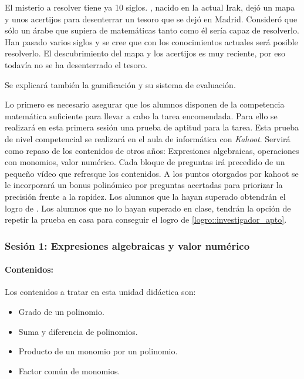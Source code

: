 El misterio a resolver tiene ya 10 siglos.
%
\Arab, nacido en la actual Irak, dejó un mapa y unos acertijos para desenterrar un tesoro que se dejó en Madrid.
%
Consideró que sólo un árabe que supiera de matemáticas tanto como él sería capaz de resolverlo.
%
Han pasado varios siglos y se cree que con los conocimientos actuales será posible resolverlo.
%
El descubrimiento del mapa y los acertijos es muy reciente, por eso todavía no se ha desenterrado el tesoro.

Se explicará también la gamificación y su sistema de evaluación.
%


Lo primero es necesario asegurar que los alumnos disponen de la competencia matemática suficiente para llevar a cabo la tarea encomendada.
%
Para ello se realizará en esta primera sesión una prueba de aptitud para la tarea.
%
Esta prueba de nivel competencial se realizará en el aula de informática con \textit{Kahoot}.
%
Servirá como repaso de los contenidos de otros años: Expresiones algebraicas, operaciones con monomios, valor numérico.
%
Cada bloque de preguntas irá precedido de un pequeño vídeo que refresque los contenidos.
%
A los puntos otorgados por kahoot se le incorporará un bonus polinómico por preguntas acertadas para priorizar la precisión frente a la rapidez.
%
Los alumnos que la hayan superado obtendrán el logro de .
%
Los alumnos que no lo hayan superado en clase, tendrán la opción de repetir la prueba en casa para conseguir el logro de \ref{logro::investigador_apto}.



\subsubsection{Sesión 1: Expresiones algebraicas y valor numérico}

\paragraph{Contenidos:}
Los contenidos a tratar en esta unidad didáctica son:
\begin{itemize}
\item Grado de un polinomio.
\item Suma y diferencia de polinomios.
\item Producto de un monomio por un polinomio.
\item Factor común de monomios.
\end{itemize}


